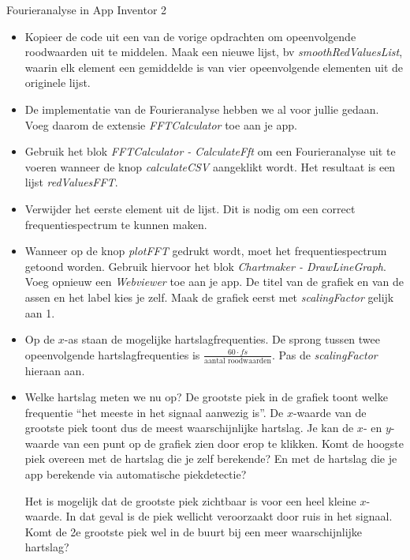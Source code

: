\begin{opdracht}{Fourieranalyse in App Inventor 2}
\begin{itemize}
	\item Kopieer de code uit een van de vorige opdrachten om opeenvolgende roodwaarden uit te middelen. Maak een nieuwe lijst, bv \emph{smoothRedValuesList}, waarin elk element een gemiddelde is van vier opeenvolgende elementen uit de originele lijst. 
	
	
 	\item De implementatie van de Fourieranalyse hebben we al voor jullie gedaan. Voeg daarom de extensie \emph{FFTCalculator} toe aan je app.
 	
	\item Gebruik het blok \emph{FFTCalculator - CalculateFft} om een Fourieranalyse uit te voeren wanneer de knop \emph{calculateCSV} aangeklikt wordt. Het resultaat is een lijst \emph{redValuesFFT}. 
	
	\item Verwijder het eerste element uit de lijst. Dit is nodig om een correct frequentiespectrum te kunnen maken.
	
	\item Wanneer op de knop \emph{plotFFT} gedrukt wordt, moet het frequentiespectrum getoond worden. Gebruik hiervoor het blok \emph{Chartmaker - DrawLineGraph}. Voeg opnieuw een \emph{Webviewer} toe aan je app. De titel van de grafiek en van de assen en het label kies je zelf. Maak de grafiek eerst met \emph{scalingFactor} gelijk aan 1.
	
	\item Op de $x$-as staan de mogelijke hartslagfrequenties. De sprong tussen twee opeenvolgende hartslagfrequenties is $\frac{60 \cdot fs}{\text{aantal roodwaarden}}$. Pas de \emph{scalingFactor} hieraan aan.

	
	\item Welke hartslag meten we nu op? De grootste piek in de grafiek toont welke frequentie \textquotedblleft het meeste in het signaal aanwezig is\textquotedblright. De $x$-waarde van de grootste piek toont dus de meest waarschijnlijke hartslag. Je kan de $x$- en $y$- waarde van een punt op de grafiek zien door erop te klikken. Komt de hoogste piek overeen met de hartslag die je zelf berekende? En met de hartslag die je app berekende via automatische piekdetectie?

	
	\begin{opmerking}
		Het is mogelijk dat de grootste piek zichtbaar is voor een heel kleine $x$-waarde. In dat geval is de piek wellicht veroorzaakt door ruis in het signaal. Komt de 2e grootste piek wel in de buurt bij een meer waarschijnlijke hartslag?
	\end{opmerking}


\end{itemize}
\end{opdracht}
